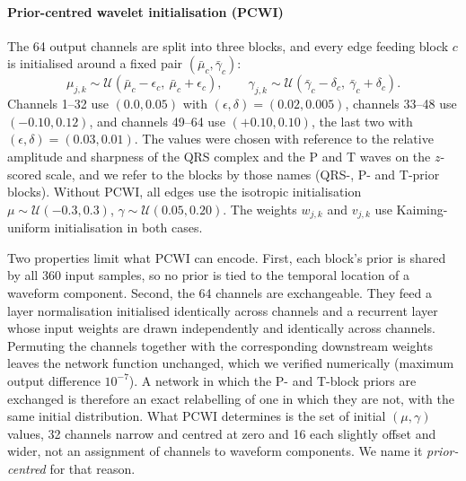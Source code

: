 \documentclass[preprint,12pt]{elsarticle}
\begin{document}
\paragraph{Prior-centred wavelet initialisation (PCWI)}
\label{sec:pcwi}
The 64 output channels are split into three blocks, and every edge feeding block $c$ is initialised around a fixed pair $(\bar\mu_c,\bar\gamma_c)$:
\begin{equation}
\mu_{j,k} \sim \mathcal{U}(\bar\mu_c - \epsilon_c,\ \bar\mu_c + \epsilon_c),\qquad
\gamma_{j,k} \sim \mathcal{U}(\bar\gamma_c - \delta_c,\ \bar\gamma_c + \delta_c).
\label{eq:pcwi}
\end{equation}
Channels 1--32 use $(0.0, 0.05)$ with $(\epsilon,\delta) = (0.02, 0.005)$, channels 33--48 use $(-0.10, 0.12)$, and channels 49--64 use $(+0.10, 0.10)$, the last two with $(\epsilon,\delta) = (0.03, 0.01)$. The values were chosen with reference to the relative amplitude and sharpness of the QRS complex and the P and T waves on the $z$-scored scale, and we refer to the blocks by those names (QRS-, P- and T-prior blocks). Without PCWI, all edges use the isotropic initialisation $\mu \sim \mathcal{U}(-0.3, 0.3)$, $\gamma \sim \mathcal{U}(0.05, 0.20)$. The weights $w_{j,k}$ and $v_{j,k}$ use Kaiming-uniform initialisation in both cases.

Two properties limit what PCWI can encode. First, each block's prior is shared by all 360 input samples, so no prior is tied to the temporal location of a waveform component. Second, the 64 channels are exchangeable. They feed a layer normalisation initialised identically across channels and a recurrent layer whose input weights are drawn independently and identically across channels. Permuting the channels together with the corresponding downstream weights leaves the network function unchanged, which we verified numerically (maximum output difference $10^{-7}$). A network in which the P- and T-block priors are exchanged is therefore an exact relabelling of one in which they are not, with the same initial distribution. What PCWI determines is the set of initial $(\mu,\gamma)$ values, 32 channels narrow and centred at zero and 16 each slightly offset and wider, not an assignment of channels to waveform components. We name it \emph{prior-centred} for that reason.
\end{document}
